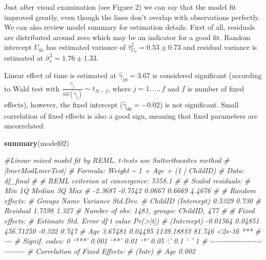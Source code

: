\documentclass[
  12pt,
]{article}
\newenvironment{Shaded}{\begin{snugshade}}{\end{snugshade}}
\newcommand{\CommentTok}[1]{\textcolor[rgb]{0.56,0.35,0.01}{\textit{#1}}}
\newcommand{\FunctionTok}[1]{\textcolor[rgb]{0.13,0.29,0.53}{\textbf{#1}}}
\newcommand{\NormalTok}[1]{#1}
\begin{document}
Just after visual examination (see Figure 2) we can say that the model
fit improved greatly, even though the lines don't overlap with
observations perfectly. We can also review model summary for estimation
details. First of all, residuals are distributed around zero which may
be an indicator for a good fit. Random intercept \(U_{0i}\) has
estimated variance of \(\hat \tau_{U_0}^2 = 0.53\pm 0.73\) and residual
variance is estimated at \(\hat \sigma_e^2 = 1.76 \pm 1.33\).

Linear effect of time is estimated at \(\hat \gamma_{10} = 3.67\) is
considered significant (according to Wald test with
\(\frac{\hat\gamma_j}{SE(\hat\gamma_j)} \sim t_{N-f}\), where
\(j = 1,\ldots,f\) and \(f\) is number of fixed effects), however, the
fixed intercept (\(\hat \gamma_{00} = -0.02\)) is not significant. Small
correlation of fixed effects is also a good sign, meaning that fixed
parameters are uncorrelated.

\begin{Shaded}
\begin{Highlighting}[]
\FunctionTok{summary}\NormalTok{(model02)}

\CommentTok{\#Linear mixed model fit by REML. t{-}tests use Satterthwaite\textquotesingle{}s method }
\CommentTok{\#[lmerModLmerTest]}
\CommentTok{\# Formula: Weight \textasciitilde{} 1 + Age + (1 | ChildID)}
\CommentTok{\#    Data: df\_final}
\CommentTok{\# }
\CommentTok{\# REML criterion at convergence: 5358.1}
\CommentTok{\# }
\CommentTok{\# Scaled residuals: }
\CommentTok{\#     Min      1Q  Median      3Q     Max }
\CommentTok{\# {-}2.3687 {-}0.7542  0.0667  0.6669  4.4676 }
\CommentTok{\# }
\CommentTok{\# Random effects:}
\CommentTok{\#  Groups   Name        Variance Std.Dev.}
\CommentTok{\#  ChildID  (Intercept) 0.5329   0.730   }
\CommentTok{\#  Residual             1.7598   1.327   }
\CommentTok{\# Number of obs: 1481, groups:  ChildID, 477}
\CommentTok{\# }
\CommentTok{\# Fixed effects:}
\CommentTok{\#               Estimate Std. Error         df t value Pr(\textgreater{}|t|)    }
\CommentTok{\# (Intercept)   {-}0.01564    0.04851  456.71250  {-}0.322    0.747    }
\CommentTok{\# Age            3.67481    0.04495 1139.18833  81.746   \textless{}2e{-}16 ***}
\CommentTok{\# {-}{-}{-}}
\CommentTok{\# Signif. codes:  0 ‘***’ 0.001 ‘**’ 0.01 ‘*’ 0.05 ‘.’ 0.1 ‘ ’ 1}
\CommentTok{\# {-}{-}{-}{-}{-}{-}{-}{-}{-}{-}{-}{-}{-}{-}{-}{-}{-}{-}{-}{-}{-}{-}{-}{-}{-}{-}{-}{-}}
\CommentTok{\# Correlation of Fixed Effects:}
\CommentTok{\#     (Intr)}
\CommentTok{\# Age 0.002 }
\end{Highlighting}
\end{Shaded}
\end{document}
